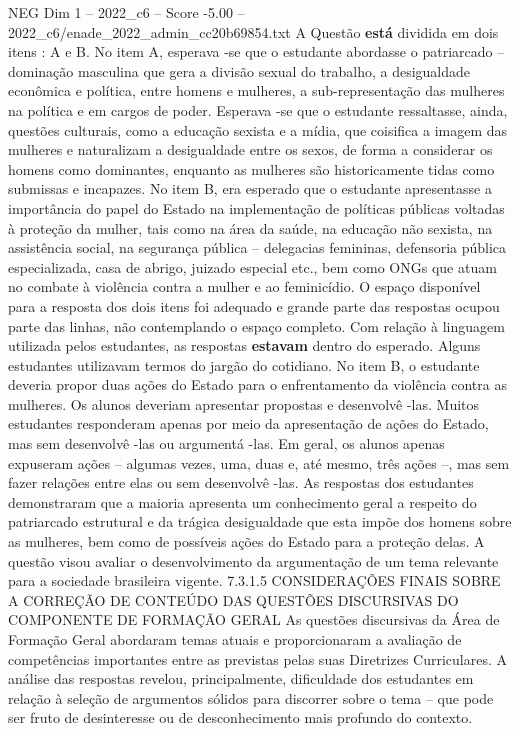 \begin{textsample}{NEG Dim 1 – 2022\_c6 – Score -5.00 – 2022\_c6/enade\_2022\_admin\_cc20b69854.txt}
A Questão \textbf{está} dividida em dois itens : A e B.
No item A, esperava -se que o estudante abordasse o patriarcado – dominação masculina que gera a divisão sexual do trabalho, a desigualdade econômica e política, entre homens e mulheres, a sub-representação das mulheres na política e em cargos de poder.
Esperava -se que o estudante ressaltasse, ainda, questões culturais, como a educação sexista e a mídia, que coisifica a imagem das mulheres e naturalizam a desigualdade entre os sexos, de forma a considerar os homens como dominantes, enquanto as mulheres são historicamente tidas como submissas e incapazes.
No item B, era esperado que o estudante apresentasse a importância do papel do Estado na implementação de políticas públicas voltadas à proteção da mulher, tais como na área da saúde, na educação não sexista, na assistência social, na segurança pública – delegacias femininas, defensoria pública especializada, casa de abrigo, juizado especial etc., bem como ONGs que atuam no combate à violência contra a mulher e ao feminicídio.
O espaço disponível para a resposta dos dois itens foi adequado e grande parte das respostas ocupou parte das linhas, não contemplando o espaço completo.
Com relação à linguagem utilizada pelos estudantes, as respostas \textbf{estavam} dentro do esperado.
Alguns estudantes utilizavam termos do jargão do cotidiano.
No item B, o estudante deveria propor duas ações do Estado para o enfrentamento da violência contra as mulheres.
Os alunos deveriam apresentar propostas e desenvolvê -las.
Muitos estudantes responderam apenas por meio da apresentação de ações do Estado, mas sem desenvolvê -las ou argumentá -las.
Em geral, os alunos apenas expuseram ações – algumas vezes, uma, duas e, até mesmo, três ações –, mas sem fazer relações entre elas ou sem desenvolvê -las.
As respostas dos estudantes demonstraram que a maioria apresenta um conhecimento geral a respeito do patriarcado estrutural e da trágica desigualdade que esta impõe dos homens sobre as mulheres, bem como de possíveis ações do Estado para a proteção delas.
A questão visou avaliar o desenvolvimento da argumentação de um tema relevante para a sociedade brasileira vigente. 7.3.1.5 CONSIDERAÇÕES FINAIS SOBRE A CORREÇÃO DE CONTEÚDO DAS QUESTÕES DISCURSIVAS DO COMPONENTE DE FORMAÇÃO GERAL As questões discursivas da Área de Formação Geral abordaram temas atuais e proporcionaram a avaliação de competências importantes entre as previstas pelas suas Diretrizes Curriculares.
A análise das respostas revelou, principalmente, dificuldade dos estudantes em relação à seleção de argumentos sólidos para discorrer sobre o tema – que pode ser fruto de desinteresse ou de desconhecimento mais profundo do contexto.

\end{textsample}

